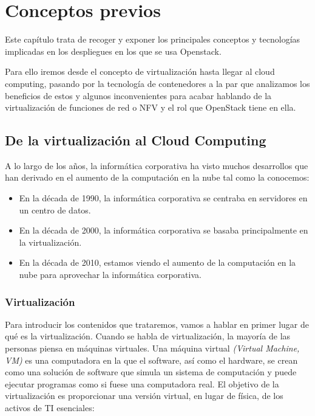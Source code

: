\chapter{Conceptos previos} 
\label{chap:conceptos previos}
Este capítulo trata de recoger y exponer los principales conceptos y tecnologías implicadas en los despliegues en los que se usa Openstack.

Para ello iremos desde el concepto de virtualización hasta llegar al cloud computing, pasando por la tecnología de contenedores a la par que analizamos los beneficios de estos y algunos inconvenientes para acabar hablando de la virtualización de funciones de red o NFV y el rol que OpenStack tiene en ella.

\section{De la virtualización al Cloud Computing}

A lo largo de los años, la informática corporativa ha visto muchos desarrollos que han derivado en el aumento de la computación en la nube tal como la conocemos:

\begin{itemize}
\item En la década de 1990, la informática corporativa se centraba en servidores en un centro de datos.
\item En la década de 2000, la informática corporativa se basaba principalmente en la virtualización.
\item En la década de 2010, estamos viendo el aumento de la computación en la nube para aprovechar la informática corporativa.
\end{itemize}

\subsection{Virtualización}
Para introducir los contenidos que trataremos, vamos a hablar en primer lugar de qué es la virtualización. Cuando se habla de virtualización, la mayoría de las personas piensa en máquinas virtuales. Una máquina virtual \textit{(Virtual Machine, VM)} es una computadora en la que el software, así como el hardware, se crean como una solución de software que simula un sistema de computación  y puede ejecutar programas como si fuese una computadora real. El objetivo de la virtualización es proporcionar una versión virtual, en lugar de física, de los activos de TI esenciales:

